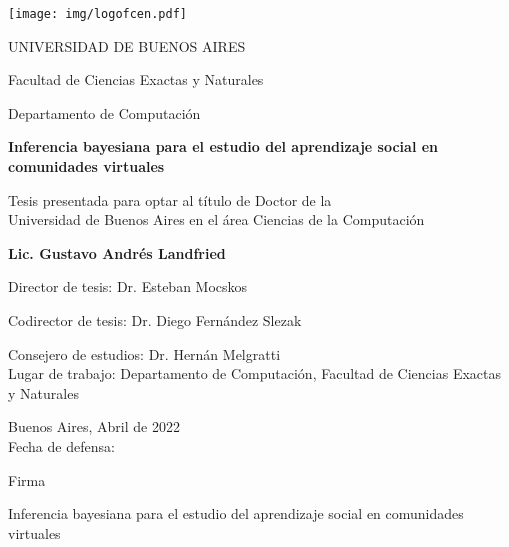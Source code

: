 \documentclass[a4paper,10pt]{book}
\author{Gustavo Landfried}
\makeatletter
\renewcommand{\frontmatter}{\cleardoublepage\@mainmatterfalse}
\theoremstyle{definition}1
\newcommand{\TITULO}[0]{Inferencia bayesiana para el estudio del aprendizaje social en comunidades virtuales}
\makeatother
\begin{document}
\frontmatter
{}




\begin{center}

\texttt{[image: img/logofcen.pdf]}

\medskip
UNIVERSIDAD DE BUENOS AIRES

Facultad de Ciencias Exactas y Naturales

Departamento de Computaci\'on


\vspace{3cm}

\textbf{\LARGE \TITULO}

\vspace{1cm}



Tesis presentada para optar al t\'itulo de Doctor de la \\
Universidad de Buenos Aires en el \'area Ciencias de la Computaci\'on

\vspace{3cm}

\textbf{Lic. Gustavo Andrés Landfried}

\end{center}

\vspace{2.5cm}

\noindent Director de tesis: Dr. Esteban Mocskos 

\noindent Codirector de tesis: Dr. Diego Fernández Slezak

\noindent Consejero de estudios: Dr. Hernán Melgratti \\

\noindent Lugar de trabajo: Departamento de Computación, Facultad de Ciencias Exactas y Naturales

\vspace{0.5cm}

\noindent Buenos Aires, Abril de 2022\\

\noindent Fecha de defensa: \\%

\vspace{0.5cm}

\hspace*{0pt}\hfill Firma \hspace{2cm}



\begin{center}
\Large \TITULO \normalsize
\end{center}
\end{document}
